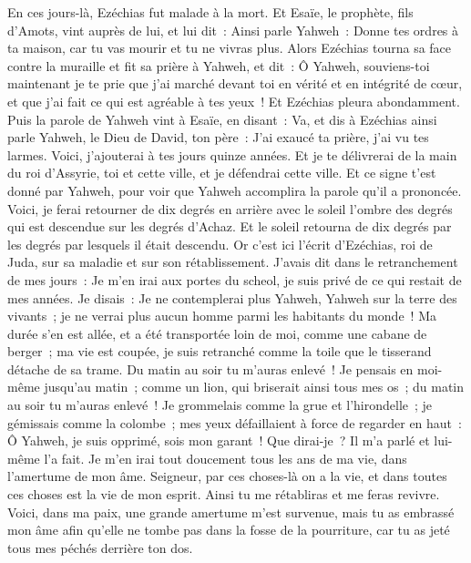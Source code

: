 \begin{multicols}{2}
\VerseOne{}En ces jours-là, Ezéchias fut malade à la mort. Et Esaïe, le prophète, fils d'Amots, vint auprès de lui, et lui dit~: Ainsi parle Yahweh~: Donne tes ordres à ta maison, car tu vas mourir et tu ne vivras plus.
Alors Ezéchias tourna sa face contre la muraille et fit sa prière à Yahweh,
et dit~: Ô Yahweh, souviens-toi maintenant je te prie que j'ai marché devant toi en vérité et en intégrité de cœur, et que j'ai fait ce qui est agréable à tes yeux~! Et Ezéchias pleura abondamment.
Puis la parole de Yahweh vint à Esaïe, en disant~:
Va, et dis à Ezéchias ainsi parle Yahweh, le Dieu de David, ton père~: J'ai exaucé ta prière, j'ai vu tes larmes. Voici, j'ajouterai à tes jours quinze années.
Et je te délivrerai de la main du roi d'Assyrie, toi et cette ville, et je défendrai cette ville.
Et ce signe t'est donné par Yahweh, pour voir que Yahweh accomplira la parole qu'il a prononcée.
Voici, je ferai retourner de dix degrés en arrière avec le soleil l'ombre des degrés qui est descendue sur les degrés d'Achaz. Et le soleil retourna de dix degrés par les degrés par lesquels il était descendu.
Or c'est ici l'écrit d'Ezéchias, roi de Juda, sur sa maladie et sur son rétablissement.
J'avais dit dans le retranchement de mes jours~: Je m'en irai aux portes du scheol, je suis privé de ce qui restait de mes années.
Je disais~: Je ne contemplerai plus Yahweh, Yahweh sur la terre des vivants~; je ne verrai plus aucun homme parmi les habitants du monde~!
Ma durée s'en est allée, et a été transportée loin de moi, comme une cabane de berger~; ma vie est coupée, je suis retranché comme la toile que le tisserand détache de sa trame. Du matin au soir tu m'auras enlevé~!
Je pensais en moi-même jusqu'au matin~; comme un lion, qui briserait ainsi tous mes os~; du matin au soir tu m'auras enlevé~!
Je grommelais comme la grue et l'hirondelle~; je gémissais comme la colombe~; mes yeux défaillaient à force de regarder en haut~: Ô Yahweh, je suis opprimé, sois mon garant~!
Que dirai-je~? Il m'a parlé et lui-même l'a fait. Je m'en irai tout doucement tous les ans de ma vie, dans l'amertume de mon âme.
Seigneur, par ces choses-là on a la vie, et dans toutes ces choses est la vie de mon esprit. Ainsi tu me rétabliras et me feras revivre.
Voici, dans ma paix, une grande amertume m'est survenue, mais tu as embrassé mon âme afin qu'elle ne tombe pas dans la fosse de la pourriture, car tu as jeté tous mes péchés derrière ton dos.

\end{multicols}

